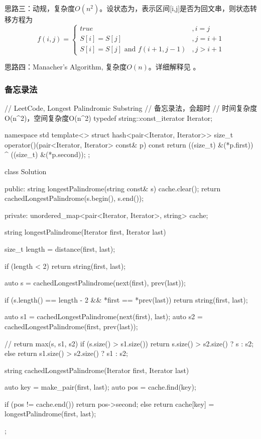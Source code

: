 思路三：动规，复杂度$O(n^2)$。设状态为，表示区间[i,j]是否为回文串，则状态转移方程为
$$
f(i,j)=\begin{cases}
true & ,i=j\\
S[i]=S[j] & , j = i + 1 \\
S[i]=S[j] \text{ and } f(i+1, j-1) & , j > i + 1
\end{cases}
$$

思路四：Manacher’s Algorithm, 复杂度$O(n)$。详细解释见  。


\subsubsection{备忘录法}
\begin{Code}
// LeetCode, Longest Palindromic Substring
// 备忘录法，会超时
// 时间复杂度O(n^2)，空间复杂度O(n^2)
typedef string::const_iterator Iterator;

namespace std {
template<>
struct hash<pair<Iterator, Iterator>> {
    size_t operator()(pair<Iterator, Iterator> const& p) const {
        return ((size_t) &(*p.first)) ^ ((size_t) &(*p.second));
    }
};
}

class Solution {
public:
    string longestPalindrome(string const& s) {
        cache.clear();
        return cachedLongestPalindrome(s.begin(), s.end());
    }

private:
    unordered_map<pair<Iterator, Iterator>, string> cache;

    string longestPalindrome(Iterator first, Iterator last) {
        size_t length = distance(first, last);

        if (length < 2) return string(first, last);

        auto s = cachedLongestPalindrome(next(first), prev(last));

        if (s.length() == length - 2 && *first == *prev(last))
            return string(first, last);

        auto s1 = cachedLongestPalindrome(next(first), last);
        auto s2 = cachedLongestPalindrome(first, prev(last));

        // return max(s, s1, s2)
        if (s.size() > s1.size()) return s.size() > s2.size() ? s : s2;
        else return s1.size() > s2.size() ? s1 : s2;
    }

    string cachedLongestPalindrome(Iterator first, Iterator last) {
        auto key = make_pair(first, last);
        auto pos = cache.find(key);

        if (pos != cache.end()) return pos->second;
        else return cache[key] = longestPalindrome(first, last);
    }
};
\end{Code}


